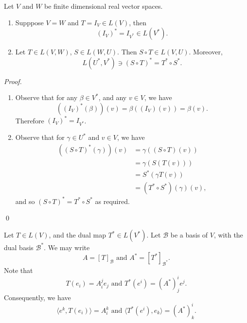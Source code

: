 \documentclass[notoc,notitlepage]{tufte-book}
\begin{document}
\begin{propo}\label{propo:identity_and_composition_of_the_dual_map}
  Let $V$ and $W$ be finite dimensional real vector spaces.
  \begin{enumerate}
    \item Supppose $V = W$ and $T = I_V \in L(V)$, then
      \begin{equation*}
        (I_V)^* = I_{V^*} \in L(V^*).
      \end{equation*}

    \item Let $T \in L(V, W)$, $S \in L(W, U)$. Then
      $S \circ T \in L(V, U)$. Moreover,
      \begin{equation*}
        L \left( U^*, V^* \right) \ni ( S \circ T )^* = T^* \circ S^*.
      \end{equation*}
  \end{enumerate}
\end{propo}

\begin{proof}
  \begin{enumerate}
    \item Observe that for any $\beta \in V^*$, and any $v \in V$,
      we have
      \begin{equation*}
        ((I_V)^*(\beta))(v) = \beta((I_V)(v)) = \beta(v).
      \end{equation*}
      Therefore $(I_V)^* = I_{V^*}$.

    \item Observe that for $\gamma \in U^*$ and $v \in V$, we have
      \begin{align*}
        ((S \circ T)^*(\gamma))(v)
          &= \gamma ( ( S \circ T ) (v) ) \\
          &= \gamma ( S ( T ( v ) ) ) \\
          &= S^* ( \gamma T(v) ) \\
          &= ( T^* \circ S^* )(\gamma)(v),
      \end{align*}
      and so $( S \circ T )^* = T^* \circ S^*$ as required.
  \end{enumerate}\qed\
\end{proof}

Let $T \in L(V)$, and the dual map $T^* \in L(V^*)$.
Let $\mathcal{B}$ be a basis of $V$, with the dual basis
$\mathcal{B}^*$. We may write
\begin{equation*}
  A = [T]_{\mathcal{B}} \text{ and } A^* = [T^*]_{\mathcal{B}^*}.
\end{equation*}
Note that
\begin{equation*}
  T(e_i) = A_i^j e_j \text{ and } T^*(e^i) = (A^*)_j^i e^j.
\end{equation*}
Consequently, we have
\begin{equation*}
  \langle e^k, T( e_i ) \rangle = A_i^k \text{ and }
  \langle T^*(e^i), e_k \rangle = (A^*)_k^i.
\end{equation*}
\end{document}
